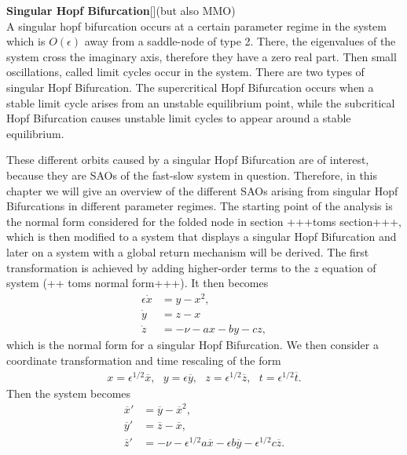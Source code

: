 \begin{definition}{\textbf{Singular Hopf Bifurcation}}[\citealp{strogatz2007nonlinear}](but also MMO) \\
A singular hopf bifurcation occurs at a certain parameter regime in the system which is $O(\epsilon)$ away from a saddle-node of type 2. There, the eigenvalues of the system cross the imaginary axis, therefore they have a zero real part. Then small oscillations, called limit cycles occur in the system. There are two types of singular Hopf Bifurcation.
The supercritical Hopf Bifurcation occurs when a stable limit cycle arises from an unstable equilibrium point, while the subcritical Hopf Bifurcation causes unstable limit cycles to appear around a stable equilibrium.
\end{definition}

These different orbits caused by a singular Hopf Bifurcation are of interest, because they are SAOs of the fast-slow system in question. Therefore, in this chapter we will give an overview of the different SAOs arising from singular Hopf Bifurcations in different parameter regimes.
The starting point of the analysis is the normal form considered for the folded node in section +++toms section+++, which is then modified to a system that displays a singular Hopf Bifurcation and later on a system with a global return mechanism will be derived.
The first transformation is achieved by adding higher-order terms to the $z$ equation of system (++ toms normal form+++). It then becomes
\begin{align*}
\epsilon \dot{x} &= y - x^2, \\
\dot{y} &= z - x \\
\dot{z} &= - \nu -ax - by - cz,
\end{align*}
which is the normal form for a singular Hopf Bifurcation.
We then consider a coordinate transformation and time rescaling of the form
\begin{align*}
x = \epsilon^{1/2}\overline{x}, \ \ \ y= \epsilon \overline{y},  \ \ \ z = \epsilon^{1/2} \overline{z},\ \ \  t= \epsilon^{1/2} \overline{t}.
\end{align*}
Then the system becomes
\begin{align} \label{sysepsilonenvir}
\overline{x}' &= \overline{y} - \overline{x}^2, \\
\overline{y}' &= \overline{z} - \overline{x}, \\
\overline{z}' &= - \nu - \epsilon^{1/2} a \overline{x} - \epsilon b \overline{y} - \epsilon^{1/2} c \overline{z}.
\end{align}
